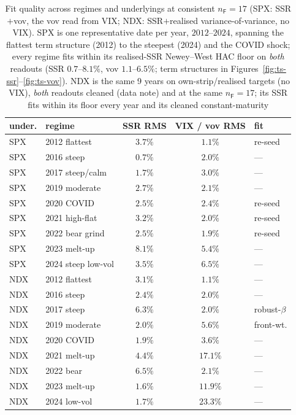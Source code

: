 \documentclass[11pt]{article}
\begin{document}
\begin{table}[h]
\centering
{\small
\begin{tabular}{llccl}
\toprule
under. & regime & SSR RMS & VIX / vov RMS & fit \\
\midrule
SPX & 2012 flattest & $3.7\%$ & $1.1\%$ & re-seed \\
SPX & 2016 steep & $0.7\%$ & $2.0\%$ & --- \\
SPX & 2017 steep/calm & $1.7\%$ & $3.0\%$ & --- \\
SPX & 2019 moderate & $2.7\%$ & $2.1\%$ & --- \\
SPX & 2020 COVID & $2.5\%$ & $2.4\%$ & re-seed \\
SPX & 2021 high-flat & $3.2\%$ & $2.0\%$ & re-seed \\
SPX & 2022 bear grind & $2.5\%$ & $1.9\%$ & re-seed \\
SPX & 2023 melt-up & $8.1\%$ & $5.4\%$ & --- \\
SPX & 2024 steep low-vol & $3.5\%$ & $6.5\%$ & --- \\
\midrule
NDX & 2012 flattest & $3.1\%$ & $1.1\%$ & --- \\
NDX & 2016 steep & $2.4\%$ & $2.0\%$ & --- \\
NDX & 2017 steep & $6.3\%$ & $2.0\%$ & robust-$\beta$ \\
NDX & 2019 moderate & $2.0\%$ & $5.6\%$ & front-wt. \\
NDX & 2020 COVID & $1.9\%$ & $3.6\%$ & --- \\
NDX & 2021 melt-up & $4.4\%$ & $17.1\%$ & --- \\
NDX & 2022 bear & $6.5\%$ & $2.1\%$ & --- \\
NDX & 2023 melt-up & $1.6\%$ & $11.9\%$ & --- \\
NDX & 2024 low-vol & $1.7\%$ & $23.3\%$ & --- \\
\bottomrule
\end{tabular}
}
\caption{Fit quality across regimes and underlyings at consistent $n_{\mathsf F}{=}17$ (SPX: SSR$+$vov, the vov
read from VIX; NDX: SSR$+$realised variance-of-variance, no VIX). SPX is one representative date per year,
$2012$--$2024$, spanning the flattest term structure (2012) to the steepest (2024) and the COVID shock; every
regime fits within its realised-SSR Newey--West HAC floor on \emph{both} readouts (SSR $0.7$--$8.1\%$, vov
$1.1$--$6.5\%$; term structures in Figures~\ref{fig:ts-ssr}--\ref{fig:ts-vov}). NDX is the same 9 years on
own-strip/realised targets (no VIX), \emph{both} readouts cleaned (data note) and at the same
$n_{\mathsf F}{=}17$; its SSR fits within its floor every year and its cleaned constant-maturity
}
\end{table}
\end{document}

